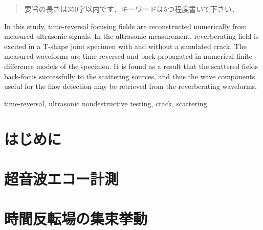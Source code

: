 \documentclass{jjsce}
\begin{document}

\begin{abstract}
要旨の長さは350字以内です．キーワードは5つ程度書いて下さい．
\end{abstract}
\begin{Eabstract}
In this study, time-reversal focusing fields are reconstructed numerically from measured ultrasonic signals. In the ultrasonic measurement, reverberating field is excited in a T-shape joint specimen with and without a simulated crack. The measured waveforms are time-reversed and back-propagated in numerical finite-difference models of the specimen. It is found as a result that the scattered fields back-focus successfully to the scattering sources, and thus the wave components useful for the flaw detection may be retrieved from the reverberating waveforms.
\end{Eabstract}
\begin{keyword}
time-reversal, ultrasonic nondestructive testing, crack, scattering
\end{keyword}
\maketitle

\section{はじめに}

\section{超音波エコー計測}

\section{時間反転場の集束挙動}

\end{document}
